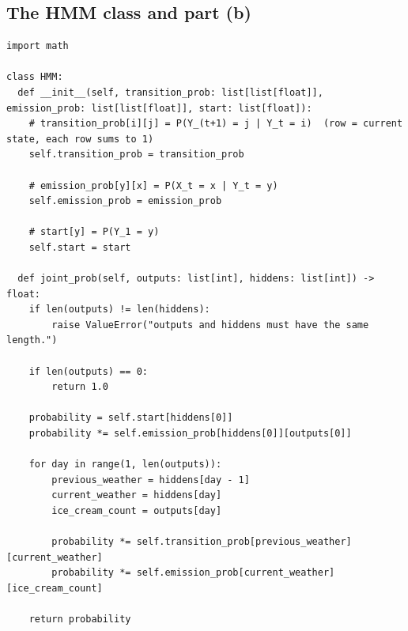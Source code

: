 \documentclass[11pt,a4paper]{article}
\begin{document}
\subsection{The HMM class and part (b)}
\begin{lstlisting}
import math

class HMM:
  def __init__(self, transition_prob: list[list[float]], emission_prob: list[list[float]], start: list[float]):
    # transition_prob[i][j] = P(Y_(t+1) = j | Y_t = i)  (row = current state, each row sums to 1)
    self.transition_prob = transition_prob

    # emission_prob[y][x] = P(X_t = x | Y_t = y)
    self.emission_prob = emission_prob

    # start[y] = P(Y_1 = y)
    self.start = start

  def joint_prob(self, outputs: list[int], hiddens: list[int]) -> float:
    if len(outputs) != len(hiddens):
        raise ValueError("outputs and hiddens must have the same length.")

    if len(outputs) == 0:
        return 1.0

    probability = self.start[hiddens[0]]
    probability *= self.emission_prob[hiddens[0]][outputs[0]]

    for day in range(1, len(outputs)):
        previous_weather = hiddens[day - 1]
        current_weather = hiddens[day]
        ice_cream_count = outputs[day]

        probability *= self.transition_prob[previous_weather][current_weather]
        probability *= self.emission_prob[current_weather][ice_cream_count]

    return probability
\end{lstlisting}
\end{document}
